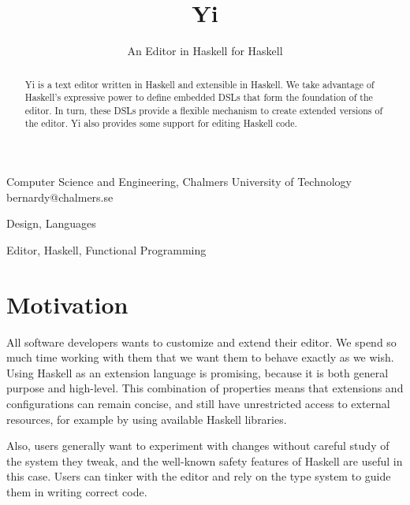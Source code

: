 \documentclass[9pt,indentedstyle,preprint]{sigplanconf}
\begin{document}
\copyrightdata{[to be supplied]} 


\title{Yi}
\subtitle{An Editor in Haskell for Haskell}

           {Computer Science and Engineering, 
            Chalmers University of Technology
          }
           {bernardy@chalmers.se}

\maketitle

\begin{abstract}
  Yi is a text editor written in Haskell and extensible in Haskell. We take
  advantage of Haskell's expressive power to define embedded DSLs that form the
  foundation of the editor. In turn, these DSLs provide a flexible
  mechanism to create extended versions of the editor. Yi also
  provides some support for editing Haskell code.
\end{abstract}


\terms
Design, Languages

\keywords
Editor, Haskell, Functional Programming

\section{Motivation}

All software developers wants to customize and extend their editor. We
spend so much time working with them that we want them to behave
exactly as we wish.  Using Haskell as an extension language is
promising, because it is both general purpose and high-level. This
combination of properties means that extensions and configurations can remain
concise, and still have unrestricted access to external resources, for
example by using available Haskell libraries.

Also, users generally want to experiment with changes without careful study of
the system they tweak, and the well-known safety features of Haskell are useful
in this case. Users can tinker with the editor and rely on the type system to
guide them in writing correct code.
\end{document}
